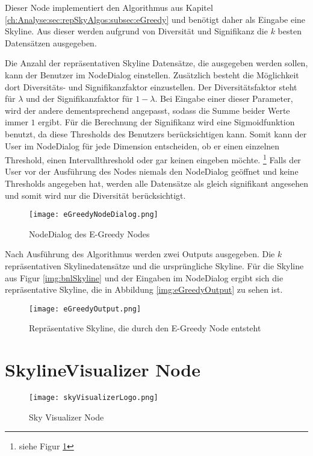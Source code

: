 Dieser Node implementiert den Algorithmus aus Kapitel \ref{ch:Analyse:sec:repSkyAlgos:subsec:eGreedy} und benötigt daher als Eingabe eine Skyline. Aus dieser werden aufgrund von Diversität und Signifikanz die $k$ besten Datensätzen ausgegeben.

Die Anzahl der repräsentativen Skyline Datensätze, die ausgegeben werden sollen, kann der Benutzer im NodeDialog einstellen. Zusätzlich besteht die Möglichkeit dort Diversitäts- und Signifikanzfaktor einzustellen. Der Diversitätsfaktor steht für $\lambda$ und der Signifikanzfaktor für $1-\lambda$. Bei Eingabe einer dieser Parameter, wird der andere dementsprechend angepasst, sodass die Summe beider Werte immer $1$ ergibt.
Für die Berechnung der Signifikanz wird eine Sigmoidfunktion benutzt, da diese Thresholds des Benutzers berücksichtigen kann. Somit kann der User im NodeDialog für jede Dimension entscheiden, ob er einen einzelnen Threshold, einen Intervallthreshold oder gar keinen eingeben möchte. \footnote{siehe Figur \ref{img:eGreedyNodeDialog}} Falls der User vor der Ausführung des Nodes niemals den NodeDialog geöffnet und keine Thresholds angegeben hat, werden alle Datensätze als gleich signifikant angesehen und somit wird nur die Diversität berücksichtigt. 

\begin{figure}[H]
	\centering
	\texttt{[image: eGreedyNodeDialog.png]}
	\caption{NodeDialog des E-Greedy Nodes}
	\label{img:eGreedyNodeDialog}
\end{figure}

Nach Ausführung des Algorithmus werden zwei Outputs ausgegeben. Die $k$ repräsentativen Skylinedatensätze und die ursprüngliche Skyline. Für die Skyline aus Figur \ref{img:bnlSkyline} und der Eingaben im NodeDialog ergibt sich die repräsentative Skyline, die in Abbildung \ref{img:eGreedyOutput} zu sehen ist.

\begin{figure}[H]
	\centering
	\texttt{[image: eGreedyOutput.png]}
	\caption{Repräsentative Skyline, die durch den E-Greedy Node entsteht}
	\label{img:eGreedyOut}
\end{figure}
\section{SkylineVisualizer Node}
\label{ch:Implementierung:sec:skyVisualizer}
\begin{figure}[H]
	\centering
	\texttt{[image: skyVisualizerLogo.png]}
	\caption{Sky Visualizer Node}
	\label{img:skyVisualizerLogo}
\end{figure}

